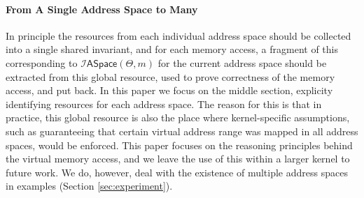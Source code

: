   


\paragraph{From A Single Address Space to Many}
In principle the resources from each individual address space should be collected into a single
shared invariant, and for each memory access,
a fragment of this corresponding to $\mathcal{I}\textsf{ASpace}(\Theta,m)$
for the current address space should be extracted from this global resource, used to prove correctness of the
memory access, and put back.
In this paper we focus on the middle section, explicity identifying resources for each
address space. The reason for this is that in practice, this global resource is also
the place where kernel-specific assumptions, such as guaranteeing that certain virtual address range
was mapped in all address spaces, would be enforced. This paper focuses on the
reasoning principles behind the virtual memory access, and we leave the use of this within a larger
kernel to future work. We do, however, deal with the existence of multiple address spaces in examples (Section \ref{sec:experiment}).

